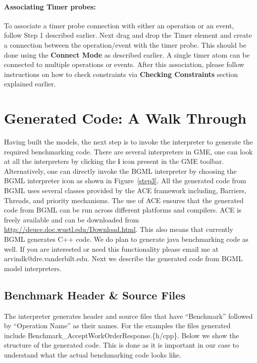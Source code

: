 \documentclass[onecolumn]{article}
\begin{document}
\paragraph* {\bf Associating Timer probes:}
To associate a timer probe connection with either an operation or an
event, follow Step 1 described earlier. Next drag and drop the Timer
element and create a connection between the operation/event with the
timer probe. This should be done using the {\bf Connect Mode} as
described earlier.  A single timer atom can be connected to multiple
operations or events. After this association, please follow
instructions on how to check constraints via {\bf Checking
Constraints} section explained earlier.

\section* {Generated Code: A Walk Through}
Having built the models, the next step is to invoke the interpreter to
generate the required benchmarking code. There are several
interpreters in GME, one can look at all the interpreters by clicking
the {\bf i} icon present in the GME toolbar. Alternatively, one can
directly invoke the BGML interpreter by choosing the BGML interpreter
icon as shown in Figure~\ref{step3}. All the generated code from BGML
uses several classes provided by the ACE framework including,
Barriers, Threads, and priority mechanisms. The use of ACE ensures
that the generated code from BGML can be run across different
platforms and compilers. ACE is freely available and can be downloaded
from \url{http://deuce.doc.wustl.edu/Download.html}. This also means
that currently BGML generates C++ code. We do plan to generate java
benchmarking code as well. If you are interested or need this
functionality please email me at arvindk@dre.vanderbilt.edu. Next
we describe the generated code from BGML model interpreters.

\subsection* {Benchmark Header \& Source Files}
The interpreter generates header and source files that have
``Benchmark'' followed by ``Operation Name'' as their names. For the
examples the files generated include
Benchmark\_AcceptWorkOrder\-Response.\{h/cpp\}. Below we show the structure
of the generated code. This is done as it is important in our case to
understand what the actual benchmarking code looks like.
\end{document}
